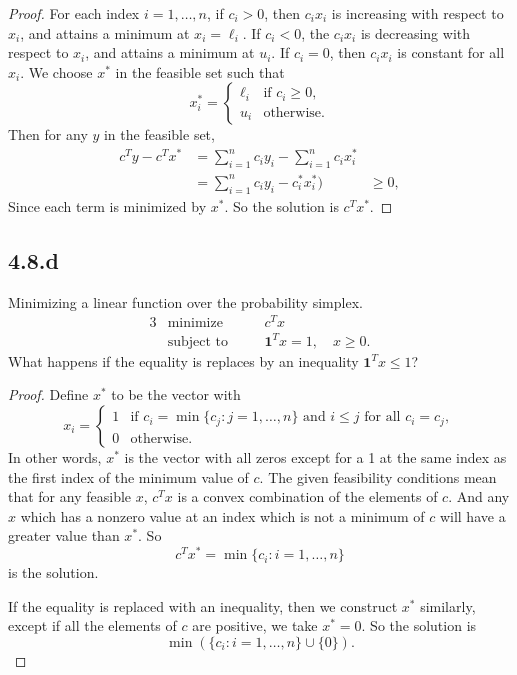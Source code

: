 \documentclass[12pt]{article}
\begin{document}
\begin{proof}
    For each index $i=1,\dots,n$, if $c_i>0$, then $c_ix_i$ is increasing with respect to $x_i$, and attains a minimum at $x_i=\ell_i$. If $c_i<0$, the $c_ix_i$ is decreasing with respect to $x_i$, and attains a minimum at $u_i$. If $c_i=0$, then $c_ix_i$ is constant for all $x_i$. We choose $x^*$ in the feasible set such that
    \[x^*_i =
        \begin{cases}
            \ell_i &\text{if } c_i\geq0, \\
            u_i &\text{otherwise.}
        \end{cases}
    \]
    Then for any $y$ in the feasible set,
    \begin{align*}
        c^Ty - c^Tx^*
            &= \sum_{i=1}^nc_iy_i - \sum_{i=1}^nc_ix^*_i \\
            &= \sum_{i=1}^nc_iy_i-c^*_ix^*_i)
            &\geq 0,
    \end{align*}
    Since each term is minimized by $x^*$. So the solution is $c^Tx^*$.
    
\end{proof}

\subsection*{4.8.d}
Minimizing a linear function over the probability simplex.
\begin{alignat*}{3}
    &\text{minimize}    &\quad& c^Tx \\
    &\text{subject to}  &\quad& \textbf{1}^Tx=1, \quad x\geq0.
\end{alignat*}
What happens if the equality is replaces by an inequality $\textbf{1}^Tx\leq1$?

\begin{proof}
    Define $x^*$ to be the vector with
    \[x_i =
        \begin{cases}
            1 &\text{if } c_i=\min\{c_j : j=1,\dots,n\} \text{ and } i\leq j \text{ for all } c_i=c_j, \\
            0 &\text{otherwise.}
        \end{cases}
    \]
    In other words, $x^*$ is the vector with all zeros except for a 1 at the same index as the first index of the minimum value of $c$. The given feasibility conditions mean that for any feasible $x$, $c^Tx$ is a convex combination of the elements of $c$. And any $x$ which has a nonzero value at an index which is not a minimum of $c$ will have a greater value than $x^*$. So
    \[c^Tx^* = \min\{c_i : i=1,\dots,n\}\]
    is the solution.
    
    If the equality is replaced with an inequality, then we construct $x^*$ similarly, except if all the elements of $c$ are positive, we take $x^*=0$. So the solution is
    \[\min(\{c_i : i=1,\dots,n\}\cup\{0\}).\]
    
    
\end{proof}
\end{document}
